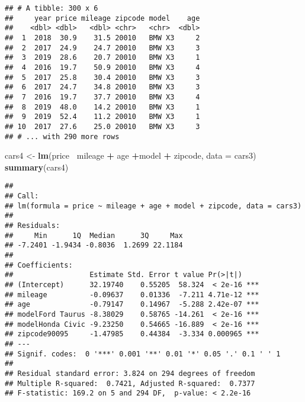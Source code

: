 \documentclass[]{article}
\newenvironment{Shaded}{\begin{snugshade}}{\end{snugshade}}
\newcommand{\DataTypeTok}[1]{\textcolor[rgb]{0.13,0.29,0.53}{#1}}
\newcommand{\DecValTok}[1]{\textcolor[rgb]{0.00,0.00,0.81}{#1}}
\newcommand{\KeywordTok}[1]{\textcolor[rgb]{0.13,0.29,0.53}{\textbf{#1}}}
\newcommand{\NormalTok}[1]{#1}
\newcommand{\OperatorTok}[1]{\textcolor[rgb]{0.81,0.36,0.00}{\textbf{#1}}}
\newcommand{\StringTok}[1]{\textcolor[rgb]{0.31,0.60,0.02}{#1}}
\begin{document}
\begin{Shaded}
\end{Shaded}

\begin{verbatim}
## # A tibble: 300 x 6
##     year price mileage zipcode model    age
##    <dbl> <dbl>   <dbl> <chr>   <chr>  <dbl>
##  1  2018  30.9    31.5 20010   BMW X3     2
##  2  2017  24.9    24.7 20010   BMW X3     3
##  3  2019  28.6    20.7 20010   BMW X3     1
##  4  2016  19.7    50.9 20010   BMW X3     4
##  5  2017  25.8    30.4 20010   BMW X3     3
##  6  2017  24.7    34.8 20010   BMW X3     3
##  7  2016  19.7    37.7 20010   BMW X3     4
##  8  2019  48.0    14.2 20010   BMW X3     1
##  9  2019  52.4    11.2 20010   BMW X3     1
## 10  2017  27.6    25.0 20010   BMW X3     3
## # ... with 290 more rows
\end{verbatim}

\begin{Shaded}
\begin{Highlighting}[]
\NormalTok{cars4 <-}\StringTok{ }\KeywordTok{lm}\NormalTok{(price}\OperatorTok{~}\StringTok{ }\NormalTok{mileage }\OperatorTok{+}\StringTok{ }\NormalTok{age }\OperatorTok{+}\NormalTok{model }\OperatorTok{+}\StringTok{ }\NormalTok{zipcode, }\DataTypeTok{data =}\NormalTok{ cars3)}
\KeywordTok{summary}\NormalTok{(cars4)}
\end{Highlighting}
\end{Shaded}

\begin{verbatim}
## 
## Call:
## lm(formula = price ~ mileage + age + model + zipcode, data = cars3)
## 
## Residuals:
##     Min      1Q  Median      3Q     Max 
## -7.2401 -1.9434 -0.8036  1.2699 22.1184 
## 
## Coefficients:
##                  Estimate Std. Error t value Pr(>|t|)    
## (Intercept)      32.19740    0.55205  58.324  < 2e-16 ***
## mileage          -0.09637    0.01336  -7.211 4.71e-12 ***
## age              -0.79147    0.14967  -5.288 2.42e-07 ***
## modelFord Taurus -8.38029    0.58765 -14.261  < 2e-16 ***
## modelHonda Civic -9.23250    0.54665 -16.889  < 2e-16 ***
## zipcode90095     -1.47985    0.44384  -3.334 0.000965 ***
## ---
## Signif. codes:  0 '***' 0.001 '**' 0.01 '*' 0.05 '.' 0.1 ' ' 1
## 
## Residual standard error: 3.824 on 294 degrees of freedom
## Multiple R-squared:  0.7421, Adjusted R-squared:  0.7377 
## F-statistic: 169.2 on 5 and 294 DF,  p-value: < 2.2e-16
\end{verbatim}
\end{document}
